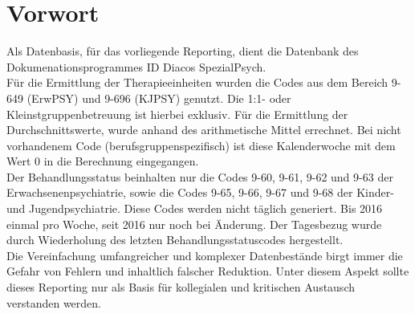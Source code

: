 \clearpage
\section{Vorwort}
Als Datenbasis, für das vorliegende Reporting, dient die Datenbank des Dokumenationsprogrammes ID Diacos SpezialPsych.\\

Für die Ermittlung der Therapieeinheiten wurden die Codes aus dem Bereich 9-649 (ErwPSY) und 9-696 (KJPSY) genutzt. Die 1:1- oder Kleinstgruppenbetreuung ist hierbei exklusiv. Für die Ermittlung der Durchschnittswerte, wurde anhand des arithmetische Mittel errechnet. Bei nicht vorhandenem Code (berufsgruppenspezifisch) ist diese Kalenderwoche mit dem Wert 0 in die Berechnung eingegangen.\\

Der Behandlungsstatus beinhalten nur die Codes 9-60, 9-61, 9-62 und 9-63 der Erwachsenenpsychiatrie, sowie die Codes 9-65, 9-66, 9-67 und 9-68 der Kinder- und Jugendpsychiatrie. Diese Codes werden nicht täglich generiert. Bis 2016 einmal pro Woche, seit 2016 nur noch bei Änderung. Der Tagesbezug wurde durch Wiederholung des letzten Behandlungsstatuscodes hergestellt.\\

Die Vereinfachung umfangreicher und komplexer Datenbestände birgt immer die Gefahr von Fehlern und inhaltlich falscher Reduktion. Unter diesem Aspekt sollte dieses Reporting nur als Basis für kollegialen und kritischen Austausch verstanden werden.